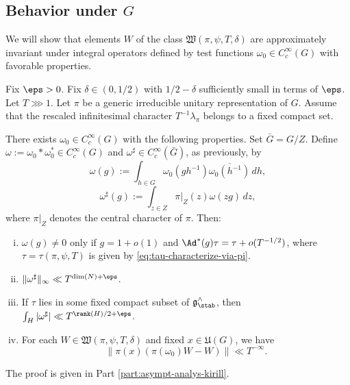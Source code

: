 \subsection{Behavior under $G$}\label{sec:behavior-under-g}
We will show that elements $W$ of the class $\mathfrak{W}(\pi,\psi,T,\delta)$ are approximately invariant under integral operators defined by test functions $\omega_0 \in C_c^\infty(G)$ with favorable properties.

\begin{theorem}\label{thm:big-group-whittaker-behavior-under-G}
  Fix $\eps > 0$.  Fix $\delta \in (0,1/2)$ with $1/2 - \delta$ sufficiently small in terms of $\eps$.  Let $T \ggg 1$.  Let $\pi$ be a generic irreducible unitary representation of $G$.  Assume that the rescaled infinitesimal character $T^{-1} \lambda_\pi$ belongs to a fixed compact set.

  There exists $\omega_0 \in C_c^\infty(G)$ with the following properties.  Set $\bar{G} = G/Z$.  Define $\omega := \omega_0 \ast \omega_0^\ast \in C_c^\infty(G)$ and $\omega^\sharp \in C_c^\infty(\bar{G})$, as previously, by
  \begin{equation*}
    \omega(g) := \int_{h \in G} \omega_0(g h^{-1}) \overline{\omega_0(h^{-1})} \, d h,
  \end{equation*}
  \begin{equation*}
    \omega^\sharp (g) := \int_{z \in Z}
    \pi|_Z (z) \omega(z g) \, d z,
  \end{equation*}
  where $\pi|_Z$ denotes the central character of $\pi$.  Then:
  \begin{enumerate}[(i)]
  \item\label{enumerate:cnpstqit4d} $\omega(g) \neq 0$ only if $g = 1 + o(1)$ and $\Ad^*(g) \tau = \tau + o(T^{-1/2})$, where $\tau = \tau(\pi,\psi,T)$ is given by \eqref{eq:tau-characterize-via-pi}.
  \item\label{enumerate:cnpstqivhi} $\|\omega^\sharp\|_{\infty} \ll T^{\dim(N)+\eps}$.
  \item\label{enumerate:cnpstqiwp2} If $\tau$ lies in some fixed compact subset of $\mathfrak{g}^\wedge_{\stab}$, then $\int_H |\omega^\sharp| \ll T^{\rank(H)/2 + \eps}$.
  \item\label{enumerate:cnpstqix13} For each $W \in \mathfrak{W}(\pi,\psi,T,\delta)$ and fixed $x \in \mathfrak{U}(G)$, we have
    \begin{equation*}
      \|\pi(x) (\pi(\omega_0)W - W)\| \ll T^{-\infty}.
    \end{equation*}
  \end{enumerate}
\end{theorem}
The proof is given in Part \ref{part:asympt-analys-kirill}.

